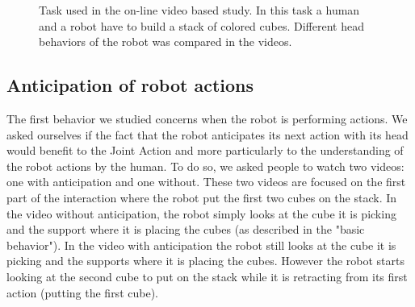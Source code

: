 \documentclass[english,a4paper,11pt,twoside]{StyleThese}
\begin{document}
\begin{figure}[!h]
\centering
    \caption{Task used in the on-line video based study. In this task a human and a robot have to build a stack of colored cubes. Different head behaviors of the robot was compared in the videos.}
    \label{fig:videoTask}
\end{figure}

\subsection{Anticipation of robot actions}

The first behavior we studied concerns when the robot is performing actions. We asked ourselves if the fact that the robot anticipates its next action with its head would benefit to the Joint Action and more particularly to the understanding of the robot actions by the human. To do so, we asked people to watch two videos: one with anticipation and one without. These two videos are focused on the first part of the interaction where the robot put the first two cubes on the stack. In the video without anticipation, the robot simply looks at the cube it is picking and the support where it is placing the cubes (as described in the "basic behavior"). In the video with anticipation the robot still looks at the cube it is picking and the supports where it is placing the cubes. However the robot starts looking at the second cube to put on the stack while it is retracting from its first action (putting the first cube).
\end{document}
